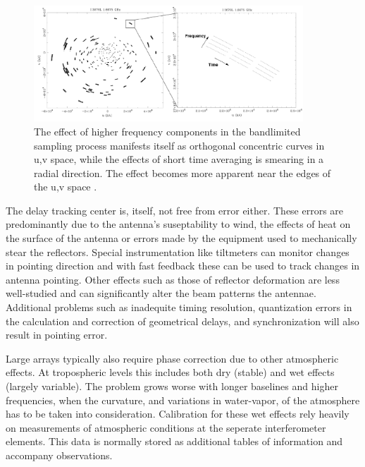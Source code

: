\documentclass[a4paper,10pt]{report}
\begin{document}
 \begin{figure}[h]
 \begin{mdframed}
 \centering
 \includegraphics[width=0.9\textwidth]{images/radial_smeering.png}
 \caption[The effects of bandwidth and short-time integration]{The effect of higher frequency components in the bandlimited sampling process manifests itself as orthogonal concentric 
 curves in u,v space, while the effects of short time averaging is smearing in a radial direction. The effect becomes more apparent near the edges of the u,v space \cite{middelberg2008high}.}
  \label{fig_radial_smeering}
 \end{mdframed}
\end{figure}

 The delay tracking center is, itself, not free from error either. These errors are predominantly due to the antenna's suseptability to wind, the effects of heat on 
 the surface of the antenna or errors made by the equipment used to mechanically stear the reflectors. Special instrumentation like tiltmeters can monitor changes in pointing 
 direction and with fast feedback these can be used to track changes in antenna pointing. Other effects such as those of reflector deformation are less well-studied and can significantly
 alter the beam patterns the antennae. Additional problems such as inadequite timing resolution, quantization errors in the calculation and correction of geometrical 
 delays, and synchronization will also result in pointing error.

 Large arrays typically also require phase correction due to other atmospheric effects. At tropospheric levels this includes both dry (stable) and wet effects (largely variable). The problem grows worse with longer baselines and higher
 frequencies, when the curvature, and variations in water-vapor, of the atmosphere has to be taken into consideration. Calibration for these wet effects rely heavily on measurements of atmospheric conditions at the seperate interferometer elements.
 This data is normally stored as additional tables of information and accompany observations.
\end{document}
